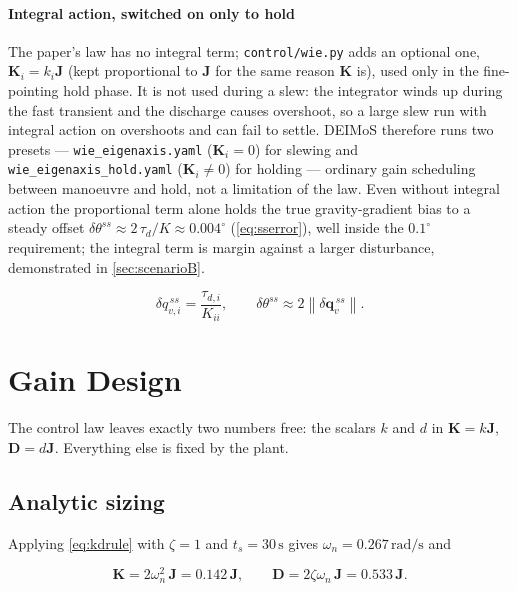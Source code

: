 \documentclass[conference,10pt,a4paper]{IEEEtran}
\newenvironment{eqbox}{\ignorespaces}{\ignorespacesafterend}
\newcommand{\vect}[1]{\bm{#1}}
\newcommand{\mat}[1]{\bm{#1}}
\newcommand{\unit}[1]{\ensuremath{\,\mathrm{#1}}}
\begin{document}
\paragraph{Integral action, switched on only to hold}
The paper's law has no integral term; \texttt{control/wie.py} adds an optional
one, $\mat{K}_i=k_i\mat{J}$ (kept proportional to $\mat{J}$ for the same reason
$\mat{K}$ is), used only in the fine-pointing hold phase. It is not used during
a slew: the integrator winds up during the fast transient and the discharge
causes overshoot, so a large slew run with integral action on overshoots and
can fail to settle. DEIMoS therefore runs two presets ---
\texttt{wie\_eigenaxis.yaml} ($\mat{K}_i=0$) for slewing and
\texttt{wie\_eigenaxis\_hold.yaml} ($\mat{K}_i\ne0$) for holding --- ordinary
gain scheduling between manoeuvre and hold, not a limitation of the law. Even
without integral action the proportional term alone holds the true
gravity-gradient bias to a steady offset $\delta\theta^{ss}\approx
2\,\tau_d/K \approx 0.004^\circ$ (\cref{eq:sserror}), well inside the
$0.1^\circ$ requirement; the integral term is margin against a larger
disturbance, demonstrated in \cref{sec:scenarioB}.

\begin{equation}
\delta q_{v,i}^{\,ss} = \frac{\tau_{d,i}}{K_{ii}},
\qquad
\delta\theta^{ss} \approx 2\left\|\delta\vect{q}_v^{\,ss}\right\| .
\label{eq:sserror}
\end{equation}

\section{Gain Design}
\label{sec:gains}

The control law leaves exactly two numbers free: the scalars $k$ and $d$ in
$\mat{K}=k\mat{J}$, $\mat{D}=d\mat{J}$. Everything else is fixed by the plant.

\subsection{Analytic sizing}
\label{sec:analytic}

Applying \cref{eq:kdrule} with $\zeta=1$ and $t_s=30\unit{s}$ gives
$\omega_n=0.267\unit{rad/s}$ and

\begin{eqbox}
\begin{equation}
\mat{K} = 2\omega_n^2\,\mat{J} = 0.142\,\mat{J},
\qquad
\mat{D} = 2\zeta\omega_n\,\mat{J} = 0.533\,\mat{J} .
\label{eq:gainmap}
\end{equation}
\end{eqbox}
\end{document}
